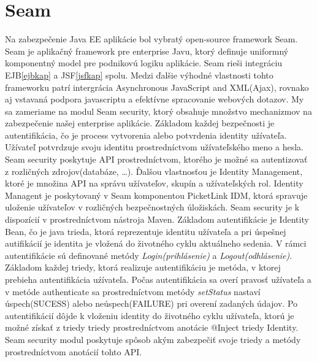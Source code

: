 \section{Seam}\label{seamkap}
Na zabezpečenie Java EE aplikácie bol vybratý open-source framework Seam\cite{seambook}. Seam je aplikačný framework pre enterprise Javu, ktorý definuje uniformný komponentný model pre podnikovú logiku aplikácie. Seam rieši integráciu EJB\ref{ejbkap} a JSF\ref{jsfkap} spolu. Medzi ďalšie výhodné vlastnosti tohto frameworku patrí intergrácia Asynchronous JavaScript and XML(Ajax)\cite{ajaxbook}, rovnako aj vstavaná podpora javascriptu a efektívne spracovanie webových dotazov. \newline \indent My sa zameriame na modul Seam security, ktorý obsahuje množstvo mechanizmov na zabezpečenie našej enterprise aplikácie. Základom každej bezpečnosti je autentifikácia, čo je process vytvorenia alebo potvrdenia identity užívateľa. Užívateľ potvrdzuje svoju identitu prostredníctvom užívateľského meno a hesla. Seam security poskytuje API prostredníctvom, ktorého je možné sa autentizovať z rozličných zdrojov(databáze, \ldots). Ďalšou vlastnosťou je Identity Management, ktoré je množina API na správu užívateľov, skupín a užívateľských rol. Identity Managent je poskytovaný v Seam komponentou PicketLink IDM, ktorá spravuje uloženie užívateľov v rozličných bezpečnostných úložiskách. Seam security je k dispozícií v prostredníctvom nástroja Maven. \newline \indent Základom autentifikácie je Identity Bean, čo je java trieda, ktorá reprezentuje identitu užívateľa a pri úspešnej autifikácií je identita je vložená do životného cyklu aktuálneho sedenia. V rámci autentifikácie sú definované metódy \emph{Login(prihlásenie)} a \emph{Logout(odhlásenie)}. Základom každej triedy, ktorá realizuje autentifikáciu je metóda, v ktorej prebieha autentifikácia uźívateľa.
Počas autentifikácia sa overí pravosť užívateľa a v metóde authenticate sa prostredníctvom metódy \emph{setStatus}  nastaví úspech(SUCESS) alebo neúspech(FAILURE) pri overení zadaných údajov. Po autentifikácií dôjde k vloženiu identity do životného cyklu užívateľa, ktorú je možné získať z triedy triedy prostredníctvom anotácie @Inject triedy Identity. \newline \indent Seam security modul poskytuje spôsob akým zabezpečiť svoje triedy a metódy prostredníctvom anotácií tohto API.
